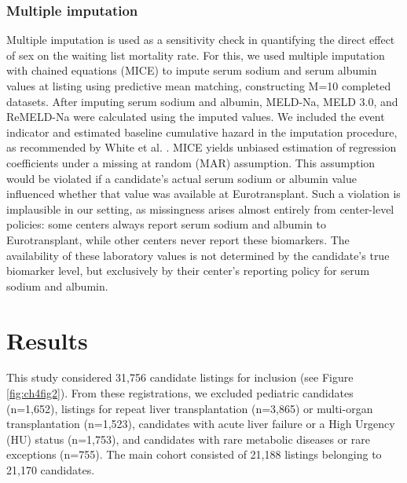 \documentclass[11pt,twoside,]{book}
\begin{document}
\subsubsection{Multiple imputation}\label{multiple-imputation}

Multiple imputation is used as a sensitivity check in quantifying the direct
effect of sex on the waiting list mortality rate. For this, we used multiple
imputation with chained equations (MICE) to impute serum sodium and serum albumin values at
listing using predictive mean matching, constructing M=10 completed datasets.
After imputing serum sodium and albumin, MELD-Na, MELD 3.0, and ReMELD-Na were
calculated using the imputed values. We included the event indicator
and estimated baseline cumulative hazard in the imputation procedure, as
recommended by White et al. \citep{whiteMultipleImputationUsing2011}.
MICE yields unbiased estimation of regression coefficients under a missing at
random (MAR) assumption. This assumption would be violated if a candidate's actual serum sodium or albumin value influenced whether that value was available at Eurotransplant. Such a violation is implausible in our setting, as missingness arises almost entirely from center-level policies: some centers always report serum sodium and albumin to Eurotransplant, while other centers never report these biomarkers. The availability of these laboratory values is not determined by the candidate's true biomarker level, but exclusively by their center's reporting policy for serum sodium and albumin.

\section{Results}\label{results-1}

This study considered 31,756 candidate listings for inclusion
(see Figure \ref{fig:ch4fig2}). From these registrations, we excluded pediatric candidates (n=1,652), listings for repeat liver transplantation (n=3,865) or multi-organ transplantation (n=1,523),
candidates with acute liver failure or a High Urgency (HU) status (n=1,753), and candidates
with rare metabolic diseases or rare exceptions (n=755). The main cohort
consisted of 21,188 listings belonging to 21,170 candidates.
\end{document}
